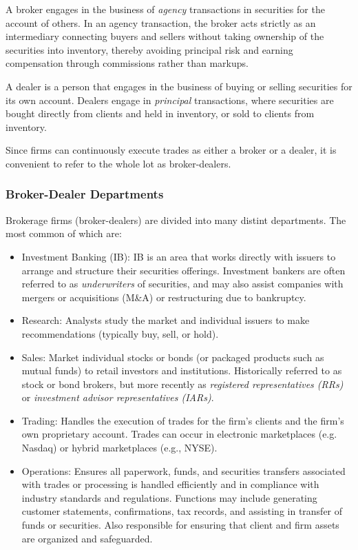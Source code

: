 \medskip

A broker engages in the business of \textit{agency} transactions in securities for the account of others. In an agency transaction, the broker acts strictly as an intermediary connecting buyers and sellers without taking ownership of the securities into inventory, thereby avoiding principal risk and earning compensation through commissions rather than markups.

A dealer is a person that engages in the business of buying or selling securities for its own account. Dealers engage in \textit{principal} transactions, where securities are bought directly from clients and held in inventory, or sold to clients from inventory. 

Since firms can continuously execute trades as either a broker or a dealer, it is convenient to refer to the whole lot as broker-dealers. 

\bigskip

\subsubsection{Broker-Dealer Departments}

\medskip

Brokerage firms (broker-dealers) are divided into many distint departments. The most common of which are:
\vspace{-1.5ex}
\begin{itemize}[label=$\circ$, itemsep=0.6em]
    \item Investment Banking (IB): IB is an area that works directly with issuers to arrange and structure their securities offerings. Investment bankers are often referred to as \textit{underwriters} of securities, and may also assist companies with mergers or acquisitions (M\&A) or restructuring due to bankruptcy. 
    \item Research: Analysts study the market and individual issuers to make recommendations (typically buy, sell, or hold).
    \item Sales: Market individual stocks or bonds (or packaged products such as mutual funds) to retail investors and institutions. Historically referred to as stock or bond brokers, but more recently as \textit{registered representatives (RRs)} or \textit{investment advisor representatives (IARs)}.
    \item Trading: Handles the execution of trades for the firm's clients and the firm's own proprietary account. Trades can occur in electronic marketplaces (e.g. Nasdaq) or hybrid marketplaces (e.g., NYSE). 
    \item Operations: Ensures all paperwork, funds, and securities transfers associated with trades or processing is handled efficiently and in compliance with industry standards and regulations. Functions may include generating customer statements, confirmations, tax records, and assisting in transfer of funds or securities. Also responsible for ensuring that client and firm assets are organized and safeguarded. 
\end{itemize}

